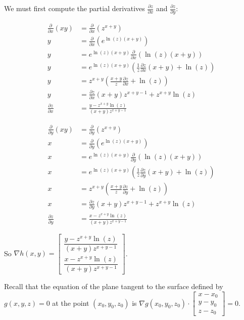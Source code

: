 \item

We must first compute the partial derivatives $\frac{\partial z}{\partial x}$ and $\frac{\partial z}{\partial y}$:

 \begin{align*}
  \frac{\partial}{\partial x}(xy) &= \frac{\partial}{\partial x}(z^{x+y}) \\
  y &= \frac{\partial}{\partial x}(e^{\ln(z)(x+y)}) \\
  y &= e^{\ln(z)(x+y)}\frac{\partial}{\partial x}(\ln(z)(x+y)) \\
  y &= e^{\ln(z)(x+y)}(\frac{1}{z}\frac{\partial z}{\partial x}(x+y) + \ln(z)) \\
  y &= z^{x+y}(\frac{x+y}{z}\frac{\partial z}{\partial x} + \ln(z)) \\
  y &= \frac{\partial z}{\partial x}(x+y)z^{x+y-1} + z^{x+y}\ln(z) \\
  \frac{\partial z}{\partial x} &= \frac{y - z^{x+y}\ln(z)}{(x+y)z^{x+y-1}}
 \end{align*}

 \begin{align*}
  \frac{\partial}{\partial y}(xy) &= \frac{\partial}{\partial y}(z^{x+y}) \\
  x &= \frac{\partial}{\partial y}(e^{\ln(z)(x+y)}) \\
  x &= e^{\ln(z)(x+y)}\frac{\partial}{\partial y}(\ln(z)(x+y)) \\
  x &= e^{\ln(z)(x+y)}(\frac{1}{z}\frac{\partial z}{\partial y}(x+y) + \ln(z)) \\
  x &= z^{x+y}(\frac{x+y}{z}\frac{\partial z}{\partial y} + \ln(z)) \\
  x &= \frac{\partial z}{\partial y}(x+y)z^{x+y-1} + z^{x+y}\ln(z) \\
  \frac{\partial z}{\partial y} &= \frac{x - z^{x+y}\ln(z)}{(x+y)z^{x+y-1}}
 \end{align*}

So $\nabla h(x,y) = \begin{bmatrix}
                \dfrac{y - z^{x+y}\ln(z)}{(x+y)z^{x+y-1}} \\
                \dfrac{x - z^{x+y}\ln(z)}{(x+y)z^{x+y-1}}
               \end{bmatrix}$.

\item

 Recall that the equation of the plane tangent to the surface defined by
 $g(x,y,z) = 0$ at the point $(x_0, y_0, z_0)$ is $\nabla g(x_0,y_0,z_0)
 \cdot \begin{bmatrix} x - x_0 \\ y - y_0 \\ z - z_0 \end{bmatrix} = 0$.

